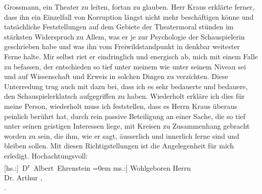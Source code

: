 \begin{ledgroupsized}[t]{13cm}
                  Grossmann, ein Theater zu leiten, fortan zu
               glauben. Herr Kraus erklärte ferner, dass ihn
               ein Einzelfall von Korruption längst nicht mehr beschäftigen könne und tatsäch{\pb}liche Feststellungen auf dem Gebiete der Theatermoral
               stünden im stärksten Widerspruch zu Allem, was er je zur Psychologie der
               Schauspielerin geschrieben habe und was ihn vom Freiwildstandpunkt in denkbar
               weitester Ferne halte. Mir selbst riet er eindringlich und energisch ab, mich mit
               einem Falle zu befassen, der entschieden so tief unter meinem wie unter seinem Niveau
               sei und auf Wissenschaft und Erweis in solchen Dingen zu verzichten. Diese
               Unterredung trug auch mit dazu bei, dass ich es sehr bedauerte und bedauere, den
               Schauspielerklatsch aufgegriffen zu haben. Wiederholt erkläre ich dies für meine
               Person, wiederholt muss ich feststellen, dass es Herrn Kraus überaus peinlich berührt hat, durch rein passive
               Beteiligung an einer Sache, die so tief unter seinen geistigen Interessen liege, mit
               Kreisen zu Zusammenhang gebracht worden zu sein, die ihm, wie er sagt, äusserlich und
               innerlich ferne sind und bleiben sollen.\pend
           \pstart
           Mit diesen Richtigstellungen ist die Angelegenheit für mich erledigt.\pend
           \pstart
           Hochachtungsvoll:{\\[\baselineskip]}\spacefill\mbox{{[}hs.:{]} D\textsuperscript{r} Albert Ehrenstein}\pend
           \leftskip=0em{}\pstart
           \noindent{}{[}ms.:{]} Wohlgeboren Herrn{\\}Dr. Arthur ,{\\}.\pend
           
         
         \endnumbering{}\end{ledgroupsized}  \newcommand{\dateiname}{L02017}\newcommand{\titel}{Albert Ehrenstein an Arthur Schnitzler, 27. 4. 1911}\newcommand{\editorInnen}{Martin Anton Müller und Gerd-Hermann Susen}
      